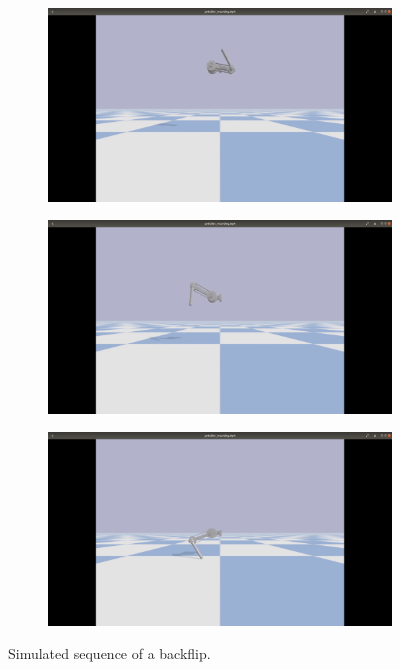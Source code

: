 \documentclass[onecolumn, letter paper]{report}
\begin{document}
\begin{figure}[htb!]
\begin{subfigure}{.16\textwidth}
    \end{subfigure}
    \begin{subfigure}{.16\textwidth}
    \includegraphics[width=\textwidth, trim={27cm 10cm 28cm 5cm}, clip]{figures/simBackflip/sb4.png}
    \end{subfigure}
    \begin{subfigure}{.16\textwidth}
    \includegraphics[width=\textwidth, trim={27cm 10cm 28cm 5cm}, clip]{figures/simBackflip/sb5.png}
    \end{subfigure}
    \begin{subfigure}{.16\textwidth}
    \includegraphics[width=\textwidth, trim={27cm 10cm 28cm 5cm}, clip]{figures/simBackflip/sb6.png}
    \end{subfigure}
    \caption{Simulated sequence of a backflip.}
    \label{fig:simflip}
\end{figure}
\end{document}

